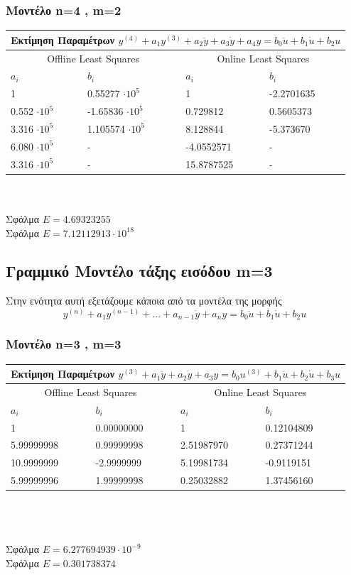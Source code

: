 \documentclass[12pt]{article}
\begin{document}
\subsubsection{Μοντέλο n=4 , m=2}
\begin{tabular}{ |p{2.5cm}|p{2.5cm}||p{2.5cm}|p{2.5cm}| }
\hline
\multicolumn{4}{|c|}{  Εκτίμηση Παραμέτρων $y^{(4)}+a_1y^{(3)}+a_2\ddot{y}+a_3\dot{y}+a_4 y= b_{0}\ddot{u}+b_{1}\dot{u}+b_{2}u$}\\
\hline
\multicolumn{2}{|c||}{Offline Least Squares}&
\multicolumn{2}{|c|}{Online Least Squares }
\\
\hline
$ a_{i}$ & $b_i$ &$ a_{i}$ & $b_i$  \\
\hline
         1        & 0.55277 $\cdot 10^{5}$ &  1    & -2.2701635\\
0.552 $\cdot 10^{5}$ & -1.65836 $\cdot 10^{5}$ & 0.729812  & 0.5605373\\
3.316 $\cdot 10^{5}$ & 1.105574 $\cdot 10^{5}$ & 8.128844  & -5.373670\\
6.080 $\cdot 10^{5}$ & -            & -4.0552571  & - \\
3.316 $\cdot 10^{5}$ & -            & 15.8787525  & - \\
\hline
\end{tabular}
\\ \\
Σφάλμα $E=4.69323255 $\\
Σφάλμα $E=7.12112913 \cdot 10^{18} $
\subsection{Γραμμικό Μοντέλο τάξης εισόδου m=3}
Στην ενότητα αυτή εξετάζουμε κάποια από τα μοντέλα της μορφής
\[ y^{(n)}+a_1y^{(n-1)}+...+a_{n-1}\dot{y}+a_{n}y=b_{0}\ddot{u}+b_{1}\dot{u}+b_{2}u\]
\subsubsection{Μοντέλο n=3 , m=3}
\begin{tabular}{ |p{2.5cm}|p{2.5cm}||p{2.5cm}|p{2.5cm}| }
\hline
\multicolumn{4}{|c|}{ Εκτίμηση Παραμέτρων $y^{(3)}+a_1\ddot{y}+a_2\dot{y}+a_3 y= b_{0}u^{(3)} +b_{1}\ddot{u}+b_{2}\dot{u}+b_{3}u$}\\
\hline
\multicolumn{2}{|c||}{Offline Least Squares}&
\multicolumn{2}{|c|}{Online Least Squares }
\\
\hline
$ a_{i}$ & $b_i$ &$ a_{i}$ & $b_i$  \\
\hline
 1          & 0.00000000 &     1       & 0.12104809 \\
 5.99999998 & 0.99999998 & 2.51987970 &  0.27371244 \\
 10.9999999 & -2.9999999 & 5.19981734  & -0.9119151 \\
 5.99999996 & 1.99999998 & 0.25032882  & 1.37456160 \\
\hline
\end{tabular}
\\ \\ \\
Σφάλμα $E=6.277694939 \cdot 10^{-9}$\\
Σφάλμα $E=0.301738374$
\end{document}
